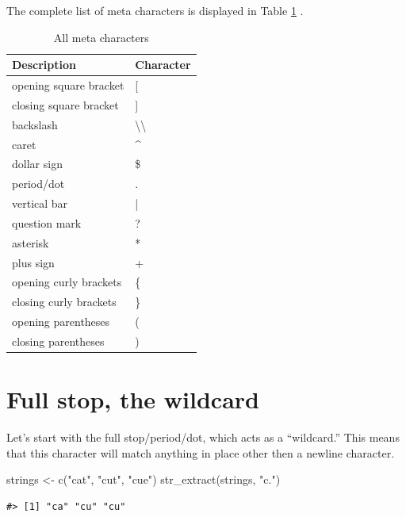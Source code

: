 \documentclass[
]{krantz}
\makeatletter
\newenvironment{Shaded}{\begin{snugshade}}{\end{snugshade}}
\newcommand{\FunctionTok}[1]{\textcolor[rgb]{0.00,0.00,0.00}{#1}}
\newcommand{\NormalTok}[1]{#1}
\newcommand{\OtherTok}[1]{\textcolor[rgb]{0.56,0.35,0.01}{#1}}
\newcommand{\StringTok}[1]{\textcolor[rgb]{0.31,0.60,0.02}{#1}}
\newenvironment{kframe}{%
\medskip{}
\setlength{\fboxsep}{.8em}
 \def\at@end@of@kframe{}%
 \ifinner\ifhmode%
  \def\at@end@of@kframe{\end{minipage}}%
  \begin{minipage}{\columnwidth}%
 \fi\fi%
 \def\FrameCommand##1{\hskip\@totalleftmargin \hskip-\fboxsep
 \colorbox{shadecolor}{##1}\hskip-\fboxsep
     \hskip-\linewidth \hskip-\@totalleftmargin \hskip\columnwidth}%
 \MakeFramed {\advance\hsize-\width
   \@totalleftmargin\z@ \linewidth\hsize
   \@setminipage}}%
 {\par\unskip\endMakeFramed%
 \at@end@of@kframe}
\renewenvironment{Shaded}{\begin{kframe}}{\end{kframe}}
\makeatother
\begin{document}
The complete list of meta characters is displayed in Table \ref{tab:metacharacters} \citep{levithan2012regular}.

\begin{table}

\caption{\label{tab:metacharacters}All meta characters}
\centering
\begin{tabular}[t]{ll}
\toprule
Description & Character\\
\midrule
opening square bracket & [\\
closing square bracket & ]\\
backslash & \textbackslash{}\textbackslash{}\\
caret & \textasciicircum{}\\
dollar sign & \$\\
\addlinespace
period/dot & .\\
vertical bar & |\\
question mark & ?\\
asterisk & *\\
plus sign & +\\
\addlinespace
opening curly brackets & \{\\
closing curly brackets & \}\\
opening parentheses & (\\
closing parentheses & )\\
\bottomrule
\end{tabular}
\end{table}

\hypertarget{full-stop-the-wildcard}{%
\section{Full stop, the wildcard}\label{full-stop-the-wildcard}}

Let's start with the full stop/period/dot, which acts as a ``wildcard.'' This means that this character will match anything in place other then a newline character.

\begin{Shaded}
\begin{Highlighting}[]
\NormalTok{strings }\OtherTok{\textless{}{-}} \FunctionTok{c}\NormalTok{(}\StringTok{"cat"}\NormalTok{, }\StringTok{"cut"}\NormalTok{, }\StringTok{"cue"}\NormalTok{)}
\FunctionTok{str\_extract}\NormalTok{(strings, }\StringTok{"c."}\NormalTok{)}
\end{Highlighting}
\end{Shaded}

\begin{verbatim}
#> [1] "ca" "cu" "cu"
\end{verbatim}
\end{document}
